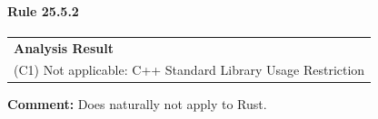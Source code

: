 \paragraph{Rule 25.5.2}
\begin{longtable}{p{13cm}}
\textbf{Analysis Result} \\
(C1) Not applicable: C++ Standard Library Usage Restriction \\
\end{longtable}
\textbf{Comment:} Does naturally not apply to Rust. \\
